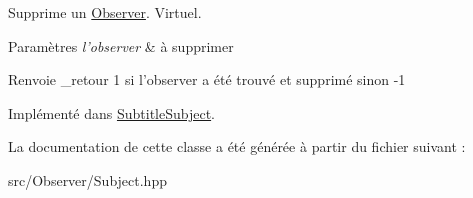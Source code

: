 Supprime un \hyperlink{classObserver}{Observer}. Virtuel. 


\begin{DoxyParams}{Paramètres}
{\em l'observer} & à supprimer \\
\hline
\end{DoxyParams}
\begin{DoxyReturn}{Renvoie}
\+\_\+retour 1 si l'observer a été trouvé et supprimé sinon -\/1 
\end{DoxyReturn}


Implémenté dans \hyperlink{classSubtitleSubject_a60e75a2a34275176aaea81738ee4879d}{Subtitle\+Subject}.



La documentation de cette classe a été générée à partir du fichier suivant \+:\begin{DoxyCompactItemize}
\item 
src/\+Observer/Subject.\+hpp\end{DoxyCompactItemize}
